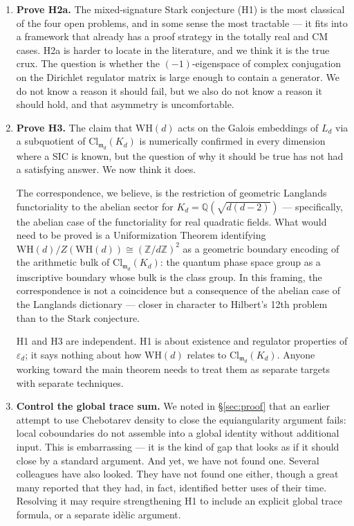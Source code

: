 \documentclass[12pt]{article}
\theoremstyle{plain}
\theoremstyle{definition}
\theoremstyle{remark}
\newcommand{\WH}{\mathrm{WH}}
\newcommand{\eps}{\varepsilon}
\newcommand{\bQ}{\mathbb{Q}}
\newcommand{\bZ}{\mathbb{Z}}
\begin{document}
\begin{enumerate}
  \item \textbf{Prove H2a.} The mixed-signature Stark conjecture (H1) is the most classical of the four open problems, and in some sense the most tractable — it fits into a framework that already has a proof strategy in the totally real and CM cases. H2a is harder to locate in the literature, and we think it is the true crux. The question is whether the $(-1)$-eigenspace of complex conjugation on the Dirichlet regulator matrix is large enough to contain a generator. We do not know a reason it should fail, but we also do not know a reason it should hold, and that asymmetry is uncomfortable.

  \item \textbf{Prove H3.} The claim that $\WH(d)$ acts on the Galois embeddings of $L_d$ via a subquotient of $\mathrm{Cl}_{\mathfrak{m}_d}(K_d)$ is numerically confirmed in every dimension where a SIC is known, but the question of why it should be true has not had a satisfying answer. We now think it does.

  The correspondence, we believe, is the restriction of geometric Langlands functoriality to the abelian sector for $K_d = \bQ(\sqrt{d(d-2)})$ — specifically, the abelian case of the functoriality for real quadratic fields. What would need to be proved is a Uniformization Theorem identifying $\WH(d)/Z(\WH(d)) \cong (\bZ/d\bZ)^2$ as a geometric boundary encoding of the arithmetic bulk of $\mathrm{Cl}_{\mathfrak{m}_d}(K_d)$: the quantum phase space group as a imscriptive boundary whose bulk is the class group. In this framing, the correspondence is not a coincidence but a consequence of the abelian case of the Langlands dictionary — closer in character to Hilbert's 12th problem than to the Stark conjecture.

  H1 and H3 are independent. H1 is about existence and regulator properties of $\eps_d$; it says nothing about how $\WH(d)$ relates to $\mathrm{Cl}_{\mathfrak{m}_d}(K_d)$. Anyone working toward the main theorem needs to treat them as separate targets with separate techniques.

  \item \textbf{Control the global trace sum.} We noted in §\ref{sec:proof} that an earlier attempt to use Chebotarev density to close the equiangularity argument fails: local coboundaries do not assemble into a global identity without additional input. This is embarrassing — it is the kind of gap that looks as if it should close by a standard argument. And yet, we have not found one. Several colleagues have also looked. They have not found one either, though a great many reported that they had, in fact, identified better uses of their time. Resolving it may require strengthening H1 to include an explicit global trace formula, or a separate id\`{e}lic argument.


\end{enumerate}
\end{document}
